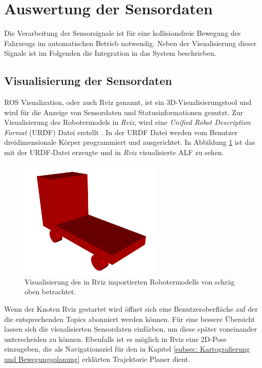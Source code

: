 				
			


		\section{Auswertung der Sensordaten}
		\label{subsec: Auswerten der Sensordaten}
		
			Die Verarbeitung der Sensorsignale ist für eine kollisionsfreie Bewegung des Fahrzeugs im automatischen Betrieb notwendig. Neben der Visualisierung dieser Signale ist im Folgenden die Integration in das System beschrieben.
		
			\subsection{Visualisierung der Sensordaten}
			\label{subsubsec: Visualisierung der Sensordaten}
			
			ROS Visualization, oder auch Rviz genannt, ist ein 3D-Visualisierungstool und wird für die Anzeige von Sensordaten und Statusinformationen genutzt. Zur Visualisierung des Robotermodels in \textit{Rviz}, wird eine \textit{Unified Robot Description Format} (URDF) Datei erstellt \cite{urdf}. In der URDF Datei werden vom Benutzer dreidimensionale Körper programmiert und ausgerichtet. In Abbildung \ref{fig: URDF} ist das mit der URDF-Datei erzeugte und in \textit{Rviz} visualisierte ALF zu sehen.
			
			\begin{figure}[H]
				\centering
				\includegraphics[width=0.6\textwidth]{Bilder/urdf.png}
				\caption{Visualisierung des in Rviz importierten Robotermodells von schräg oben betrachtet.}
				\label{fig: URDF}
			\end{figure}
			
			Wenn der Knoten Rviz gestartet wird öffnet sich eine Benutzeroberfläche auf der die entsprechenden Topics abonniert werden können. Für eine bessere Übersicht lassen sich die visualisierten Sensordaten einfärben, um diese später voneinander unterscheiden zu können. Ebenfalls ist es möglich in Rviz eine 2D-Pose einzugeben, die als Navigationsziel für den in Kapitel \ref{subsec: Kartografierung und Bewegungsplanung} erklärten Trajektorie Planer dient. \cite{rviz}  
		
